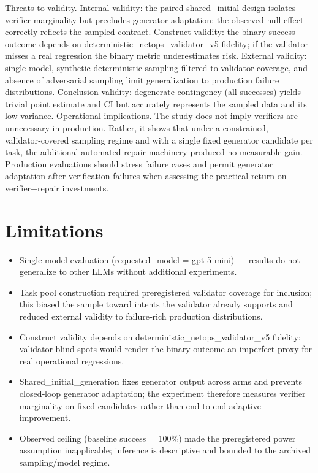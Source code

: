 \documentclass[conference]{IEEEtran}
\begin{document}
Threats to validity. Internal validity: the paired shared\_initial design isolates verifier marginality but precludes generator adaptation; the observed null effect correctly reflects the sampled contract. Construct validity: the binary success outcome depends on deterministic\_netops\_validator\_v5 fidelity; if the validator misses a real regression the binary metric underestimates risk. External validity: single model, synthetic deterministic sampling filtered to validator coverage, and absence of adversarial sampling limit generalization to production failure distributions. Conclusion validity: degenerate contingency (all successes) yields trivial point estimate and CI but accurately represents the sampled data and its low variance.
Operational implications. The study does not imply verifiers are unnecessary in production. Rather, it shows that under a constrained, validator‑covered sampling regime and with a single fixed generator candidate per task, the additional automated repair machinery produced no measurable gain. Production evaluations should stress failure cases and permit generator adaptation after verification failures when assessing the practical return on verifier+repair investments.

\section{Limitations}
\begin{itemize}
\item Single‑model evaluation (requested\_model = gpt-5-mini) --- results do not generalize to other LLMs without additional experiments.
\item Task pool construction required preregistered validator coverage for inclusion; this biased the sample toward intents the validator already supports and reduced external validity to failure‑rich production distributions.
\item Construct validity depends on deterministic\_netops\_validator\_v5 fidelity; validator blind spots would render the binary outcome an imperfect proxy for real operational regressions.
\item Shared\_initial\_generation fixes generator output across arms and prevents closed‑loop generator adaptation; the experiment therefore measures verifier marginality on fixed candidates rather than end‑to‑end adaptive improvement.
\item Observed ceiling (baseline success = 100\%) made the preregistered power assumption inapplicable; inference is descriptive and bounded to the archived sampling/model regime.
\end{itemize}
\end{document}
